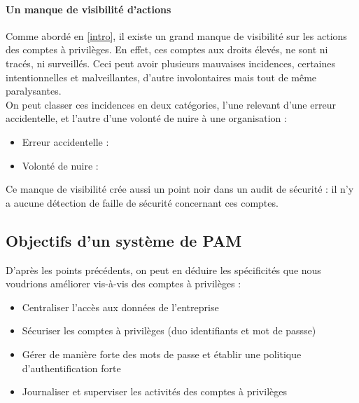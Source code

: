 \paragraph{Un manque de visibilité d'actions} Comme abordé en \ref{intro}, il existe un grand manque de visibilité sur les actions des comptes à privilèges. En effet, ces comptes aux droits élevés, ne sont ni tracés, ni surveillés. Ceci peut avoir plusieurs mauvaises incidences, certaines intentionnelles et malveillantes, d'autre involontaires mais tout de même paralysantes.\\
On peut classer ces incidences en deux catégories, l'une relevant d'une erreur accidentelle, et l'autre d'une volonté de nuire à une organisation :
\begin{itemize}
	\item Erreur accidentelle :
	\item Volonté de nuire :
\end{itemize}

Ce manque de  visibilité crée aussi un point noir dans un audit de sécurité : il n'y a aucune détection de faille de sécurité concernant ces comptes.

\subsection{Objectifs d'un système de PAM}

D'après les points précédents, on peut en déduire les spécificités que nous voudrions améliorer vis-à-vis des comptes à privilèges :
\begin{itemize}
	\item Centraliser l’accès aux données de l’entreprise
 	\item Sécuriser les comptes à privilèges (duo identifiants et mot de passse)
 	\item Gérer de manière forte des mots de passe et établir une politique d’authentification forte
	\item Journaliser et superviser les activités des comptes à privilèges
\end{itemize}

